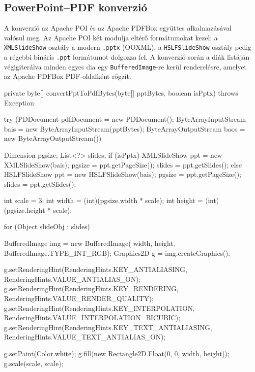 \subsection{PowerPoint–PDF konverzió}

A konverzió az Apache POI és az Apache PDFBox együttes alkalmazásával valósul meg. Az Apache POI két modulja eltérő formátumokat kezel: a \texttt{XMLSlideShow} osztály a modern \texttt{.pptx} (OOXML), a \texttt{HSLFSlideShow} osztály pedig a régebbi bináris \texttt{.ppt} formátumot dolgozza fel. A konverzió során a diák listáján végigiterálva minden egyes dia egy \texttt{BufferedImage}-re kerül renderelésre, amelyet az Apache PDFBox PDF-oldalként rögzít.

\begin{java}[caption={Dia renderelés és PDF-összeállítás},label=java:pptconvert]
private byte[] convertPptToPdfBytes(byte[] pptBytes, boolean isPptx)
        throws Exception {
    try (PDDocument pdfDocument = new PDDocument();
         ByteArrayInputStream  bais = new ByteArrayInputStream(pptBytes);
         ByteArrayOutputStream baos = new ByteArrayOutputStream()) {

        Dimension pgsize;
        List<?> slides;
        if (isPptx) {
            XMLSlideShow ppt = new XMLSlideShow(bais);
            pgsize = ppt.getPageSize();
            slides = ppt.getSlides();
        } else {
            HSLFSlideShow ppt = new HSLFSlideShow(bais);
            pgsize = ppt.getPageSize();
            slides = ppt.getSlides();
        }

        int scale = 3;
        int width  = (int)(pgsize.width  * scale);
        int height = (int)(pgsize.height * scale);

        for (Object slideObj : slides) {
            BufferedImage img = new BufferedImage(
                    width, height, BufferedImage.TYPE_INT_RGB);
            Graphics2D g = img.createGraphics();

            g.setRenderingHint(RenderingHints.KEY_ANTIALIASING,
                               RenderingHints.VALUE_ANTIALIAS_ON);
            g.setRenderingHint(RenderingHints.KEY_RENDERING,
                               RenderingHints.VALUE_RENDER_QUALITY);
            g.setRenderingHint(RenderingHints.KEY_INTERPOLATION,
                               RenderingHints.VALUE_INTERPOLATION_BICUBIC);
            g.setRenderingHint(RenderingHints.KEY_TEXT_ANTIALIASING,
                               RenderingHints.VALUE_TEXT_ANTIALIAS_ON);

            g.setPaint(Color.white);
            g.fill(new Rectangle2D.Float(0, 0, width, height));
            g.scale(scale, scale);

}}}
\end{java}
